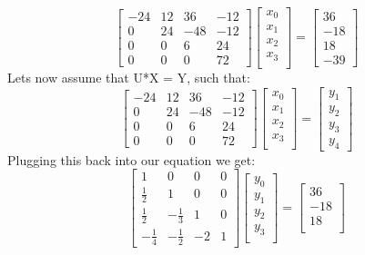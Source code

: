 \documentclass[12pt]{article}
\begin{document}
\begin{adjustwidth}{0em}{0pt}
\[\begin{bmatrix}
-24 & 12 & 36 & -12\\
0 & 24 & -48 & -12\\
0 & 0 & 6 & 24\\
0 & 0 & 0 & 72
\end{bmatrix}
\begin{bmatrix}
x_0 \\
x_1 \\
x_2 \\
x_3 \\
\end{bmatrix}
=
\begin{bmatrix}
36 \\
-18 \\
18 \\
-39
\end{bmatrix}\]
Lets now assume that U*X = Y, such that:
\[ 
\begin{bmatrix}
-24 & 12 & 36 & -12\\
0 & 24 & -48 & -12\\
0 & 0 & 6 & 24\\
0 & 0 & 0 & 72
\end{bmatrix}
\begin{bmatrix}
x_0 \\
x_1 \\
x_2 \\
x_3 \\
\end{bmatrix}
=
\begin{bmatrix}
y_1 \\
y_2 \\
y_3 \\
y_4
\end{bmatrix}\]
Plugging this back into our equation we get:
\[ 
\begin{bmatrix}
1 & 0 & 0 & 0\\
\frac{1}{2} & 1 & 0 & 0\\
\frac{1}{2} & -\frac{1}{3} & 1 & 0\\
-\frac{1}{4} & -\frac{1}{2} & -2 & 1
\end{bmatrix}
\begin{bmatrix}
y_0 \\
y_1 \\
y_2 \\
y_3 \\
\end{bmatrix}
=
\begin{bmatrix}
36 \\
-18 \\
18 \\

\end{bmatrix}\]
\end{adjustwidth}
\end{document}
